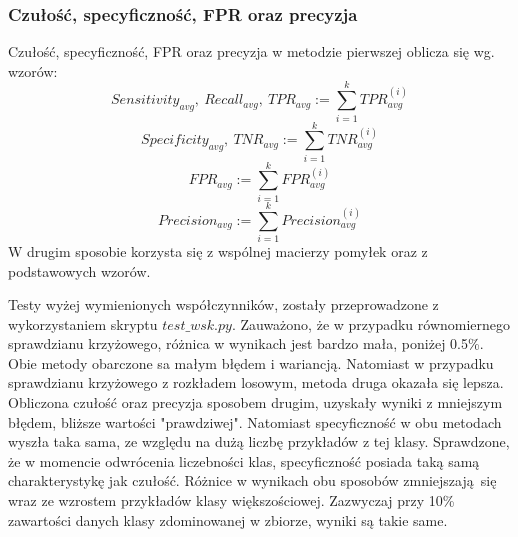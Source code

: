 \subsubsection{Czułość, specyficzność, FPR oraz precyzja}
Czułość, specyficzność, FPR oraz precyzja w metodzie pierwszej oblicza się wg. wzorów:
\[Sensitivity_{avg},\ Recall_{avg},\ TPR_{avg} := \sum_{i=1}^{k} TPR_{avg}^{(i)}\]
\[Specificity_{avg},\ TNR_{avg} := \sum_{i=1}^{k} TNR_{avg}^{(i)}\]
\[FPR_{avg} := \sum_{i=1}^{k} FPR_{avg}^{(i)}\]
\[Precision_{avg} := \sum_{i=1}^{k} Precision_{avg}^{(i)}\]
W drugim sposobie korzysta się z wspólnej macierzy pomyłek oraz z podstawowych wzorów. \par
Testy wyżej wymienionych współczynników, zostały przeprowadzone z wykorzystaniem skryptu $test\_wsk.py$. Zauważono, że w przypadku równomiernego sprawdzianu krzyżowego, różnica w wynikach jest bardzo mała, poniżej 0.5\%. Obie metody obarczone sa małym błędem i wariancją. Natomiast w przypadku sprawdzianu krzyżowego z rozkładem losowym, metoda druga okazała się lepsza. Obliczona czułość oraz precyzja sposobem drugim, uzyskały wyniki z mniejszym błędem, bliższe wartości "prawdziwej". Natomiast specyficzność w obu metodach wyszła taka sama, ze względu na dużą liczbę przykładów z tej klasy. Sprawdzone, że w momencie odwrócenia liczebności klas, specyficzność posiada taką samą charakterystykę jak czułość. Różnice w wynikach obu sposobów zmniejszają się wraz ze wzrostem przykładów klasy większościowej. Zazwyczaj przy 10\% zawartości danych klasy zdominowanej w zbiorze, wyniki są takie same.
